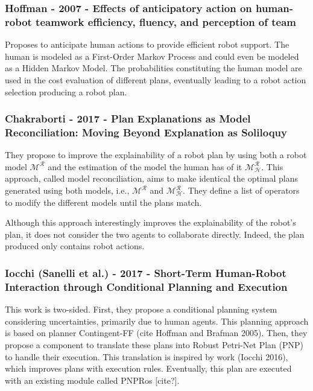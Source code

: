 \subsubsection{Hoffman - 2007 - Effects of anticipatory action on human-robot teamwork efficiency, fluency, and perception of team}
\label{w1}

\cite{hoffman_effects_2007}

Proposes to anticipate human actions to provide efficient robot support. The human is modeled as a First-Order Markov Process and could even be modeled as a Hidden Markov Model. The probabilities constituting the human model are used in the cost evaluation of different plans, eventually leading to a robot action selection producing a robot plan. 


\subsubsection{Chakraborti - 2017 - Plan Explanations as Model Reconciliation: Moving Beyond Explanation as Soliloquy}
\label{w2}

\cite{chakraborti_plan_2017}

They propose to improve the explainability of a robot plan by using both a robot model $\mathcal{M^R}$ and the estimation of the model the human has of it $\mathcal{M^R_H}$. This approach, called model reconciliation, aims to make identical the optimal plans generated using both models, i.e., $\mathcal{M^R}$ and $\mathcal{M^R_H}$. They define a list of operators to modify the different models until the plans match. 

Although this approach interestingly improves the explainability of the robot's plan, it does not consider the two agents to collaborate directly. Indeed, the plan produced only contains robot actions.  

\subsubsection{Iocchi (Sanelli et al.) - 2017 - Short-Term Human-Robot Interaction through Conditional Planning and Execution}
\label{w3}

\cite{sanelli_short_term_2017}

This work is two-sided. First, they propose a conditional planning system considering uncertainties, primarily due to human agents. This planning approach is based on planner Contingent-FF (cite Hoffman and Brafman 2005). Then, they propose a component to translate these plans into Robust Petri-Net Plan (PNP) to handle their execution. This translation is inspired by work (Iocchi 2016), which improves plans with execution rules. Eventually, this plan are executed with an existing module called PNPRos [cite?].

